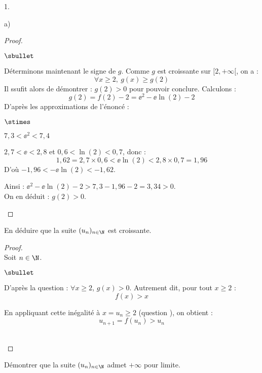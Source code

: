 \begin{noliste}{1.}
\begin{noliste}{a)}
\begin{proof}
\begin{noliste}{$\sbullet$}
      
      \item Déterminons maintenant le signe de $g$. Comme $g$ est
        croissante sur $[2, +\infty[$, on a :
        \[
        \forall x\geq 2, \ g(x) \geq g(2)
        \] 
        Il ssufit alors de démontrer : $g(2) > 0$ pour pouvoir
        conclure. Calculons : 
        \[
        g(2) = f(2)-2 = \ee^2 - \ee\ln(2) - 2
        \]
        D'après les approximations de l'énoncé :
        \begin{noliste}{$\stimes$}
	\item $7,3 < \ee^2 < 7,4$
	\item $2,7 < \ee < 2,8$ et $0,6 < \ln(2) < 0,7$, donc :
          \[
          1,62=2,7\times 0,6 < \ee \ln(2) < 2,8\times 0,7=1,96
          \]
          D'où $-1,96<-\ee\ln(2) <-1,62$.
        \end{noliste}
        Ainsi : $\ee^2 -\ee\ln(2)-2 > 7,3-1,96-2 = 3,34 > 0$.\\
        On en déduit : $g(2)>0$.%
        \conc{$\forall x\in [2,+\infty[$, $g(x)>0$}~\\[-1.4cm]
      \end{noliste}
    \end{proof}
    
  \item En déduire que la suite $(u_n)_{n\in\N}$ est croissante.
	
    \begin{proof}~\\
      Soit $n \in \N$.
      \begin{noliste}{$\sbullet$}
      \item D'après la question  : $\forall x \geq 2$,
        $g(x)>0$. Autrement dit, pour tout $x \geq 2$ :
        \[
        f(x) > x
        \]
      \item En appliquant cette inégalité à $x = u_n \geq 2$ (question
        ), on obtient : 
        \[
        u_{n+1} = f(u_n) > u_n
        \]
      \end{noliste}
      ~\\[-1.2cm]
    \end{proof}
  \end{noliste}
  
  
\item Démontrer que la suite $(u_n)_{n\in\N}$ admet $+\infty$ pour 
  limite.
  

\end{noliste}
